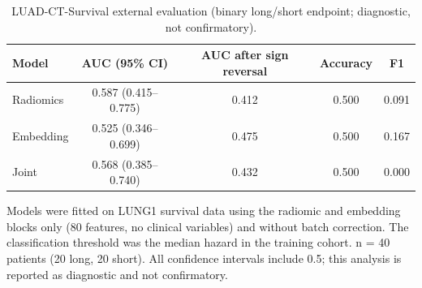 \documentclass[a4paper,fleqn]{cas-sc}
\begin{document}
\begin{table}[htbp]
\centering
\small
\setlength{\tabcolsep}{4pt}
\caption{LUAD-CT-Survival external evaluation (binary long/short endpoint; diagnostic, not confirmatory).}
\label{tbl:7}
\begin{tabular}{@{}lcccc@{}}
\toprule
Model & AUC (95\% CI) & AUC after sign reversal & Accuracy & F1 \\
\midrule
Radiomics & 0.587 (0.415--0.775) & 0.412 & 0.500 & 0.091 \\
Embedding & 0.525 (0.346--0.699) & 0.475 & 0.500 & 0.167 \\
Joint & 0.568 (0.385--0.740) & 0.432 & 0.500 & 0.000 \\
\bottomrule
\end{tabular}
\par\medskip\noindent\footnotesize Models were fitted on LUNG1 survival data using the radiomic and embedding blocks only (80 features, no clinical variables) and without batch correction. The classification threshold was the median hazard in the training cohort. n = 40 patients (20 long, 20 short). All confidence intervals include 0.5; this analysis is reported as diagnostic and not confirmatory.
\end{table}




\clearpage
\addtocounter{page}{-1}
\end{document}
